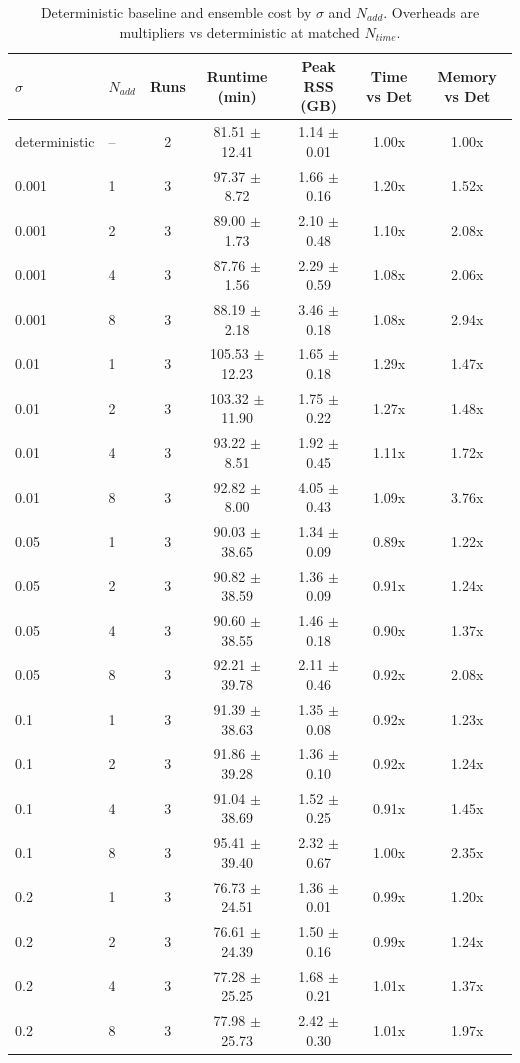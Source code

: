 \begin{table}[t]
\centering
\caption{Deterministic baseline and ensemble cost by $\sigma$ and $N_{add}$. Overheads are multipliers vs deterministic at matched $N_{time}$.}
\label{tab:runtime_ensemble_sigma_nadd}
\begin{tabular}{llccccc}
\toprule
$\sigma$ & $N_{add}$ & Runs & Runtime (min) & Peak RSS (GB) & Time vs Det & Memory vs Det \\
\midrule
deterministic & -- & 2 & 81.51 $\pm$ 12.41 & 1.14 $\pm$ 0.01 & 1.00x & 1.00x \\
0.001 & 1 & 3 & 97.37 $\pm$ 8.72 & 1.66 $\pm$ 0.16 & 1.20x & 1.52x \\
0.001 & 2 & 3 & 89.00 $\pm$ 1.73 & 2.10 $\pm$ 0.48 & 1.10x & 2.08x \\
0.001 & 4 & 3 & 87.76 $\pm$ 1.56 & 2.29 $\pm$ 0.59 & 1.08x & 2.06x \\
0.001 & 8 & 3 & 88.19 $\pm$ 2.18 & 3.46 $\pm$ 0.18 & 1.08x & 2.94x \\
0.01 & 1 & 3 & 105.53 $\pm$ 12.23 & 1.65 $\pm$ 0.18 & 1.29x & 1.47x \\
0.01 & 2 & 3 & 103.32 $\pm$ 11.90 & 1.75 $\pm$ 0.22 & 1.27x & 1.48x \\
0.01 & 4 & 3 & 93.22 $\pm$ 8.51 & 1.92 $\pm$ 0.45 & 1.11x & 1.72x \\
0.01 & 8 & 3 & 92.82 $\pm$ 8.00 & 4.05 $\pm$ 0.43 & 1.09x & 3.76x \\
0.05 & 1 & 3 & 90.03 $\pm$ 38.65 & 1.34 $\pm$ 0.09 & 0.89x & 1.22x \\
0.05 & 2 & 3 & 90.82 $\pm$ 38.59 & 1.36 $\pm$ 0.09 & 0.91x & 1.24x \\
0.05 & 4 & 3 & 90.60 $\pm$ 38.55 & 1.46 $\pm$ 0.18 & 0.90x & 1.37x \\
0.05 & 8 & 3 & 92.21 $\pm$ 39.78 & 2.11 $\pm$ 0.46 & 0.92x & 2.08x \\
0.1 & 1 & 3 & 91.39 $\pm$ 38.63 & 1.35 $\pm$ 0.08 & 0.92x & 1.23x \\
0.1 & 2 & 3 & 91.86 $\pm$ 39.28 & 1.36 $\pm$ 0.10 & 0.92x & 1.24x \\
0.1 & 4 & 3 & 91.04 $\pm$ 38.69 & 1.52 $\pm$ 0.25 & 0.91x & 1.45x \\
0.1 & 8 & 3 & 95.41 $\pm$ 39.40 & 2.32 $\pm$ 0.67 & 1.00x & 2.35x \\
0.2 & 1 & 3 & 76.73 $\pm$ 24.51 & 1.36 $\pm$ 0.01 & 0.99x & 1.20x \\
0.2 & 2 & 3 & 76.61 $\pm$ 24.39 & 1.50 $\pm$ 0.16 & 0.99x & 1.24x \\
0.2 & 4 & 3 & 77.28 $\pm$ 25.25 & 1.68 $\pm$ 0.21 & 1.01x & 1.37x \\
0.2 & 8 & 3 & 77.98 $\pm$ 25.73 & 2.42 $\pm$ 0.30 & 1.01x & 1.97x \\
\bottomrule
\end{tabular}
\end{table}
